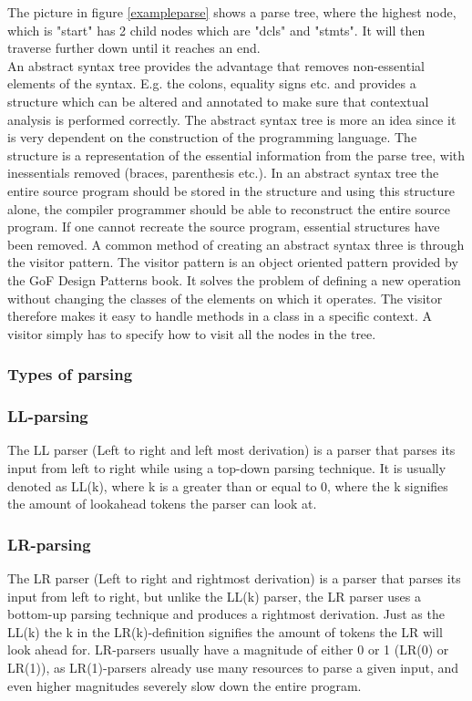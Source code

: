 The picture in figure \ref{exampleparse} shows a parse tree, where the highest node, which is "start" has 2 child nodes which are "dcls" and "stmts". It will then traverse further down until it reaches an end. \\
An abstract syntax tree provides the advantage that removes non-essential elements of the syntax. E.g. the colons, equality signs etc. and provides a structure which can be altered and annotated to make sure that contextual analysis is performed correctly.
The abstract syntax tree is more an idea since it is very dependent on the construction of the programming language. The structure is a representation of the essential information from the parse tree, with inessentials removed (braces, parenthesis etc.). In an abstract syntax tree the entire source program should be stored in the structure and using this structure alone, the compiler programmer should be able to reconstruct the entire source program. If one cannot recreate the source program, essential structures have been removed.\cite{crafting-a-compiler}
A common method of creating an abstract syntax three is through the visitor pattern. The visitor pattern is an object oriented pattern provided by the GoF Design Patterns book.
It solves the problem of defining a new operation without changing the classes of the elements on which it operates.
The visitor therefore makes it easy to handle methods in a class in a specific context. A visitor simply has to specify how to visit all the nodes in the tree.
\subsubsection{Types of parsing}
\subsubsection*{LL-parsing}
The LL parser (Left to right and left most derivation) is a parser that parses its input from left to right while using a top-down parsing technique. It is usually denoted as LL(k), where k is a greater than or equal to 0, where the k signifies the amount of lookahead tokens the parser can look at\cite{conceptsOfProgrammingLanguages}.

\subsubsection*{LR-parsing}
The LR parser (Left to right and rightmost derivation) is a parser that parses its input from left to right, but unlike the LL(k) parser, the LR parser uses a bottom-up parsing technique and produces a rightmost derivation. Just as the LL(k) the k in the LR(k)-definition signifies the amount of tokens the LR will look ahead for\cite{conceptsOfProgrammingLanguages}. LR-parsers usually have a magnitude of either 0 or 1 (LR(0) or LR(1)), as LR(1)-parsers already use many resources to parse a given input, and even higher magnitudes severely slow down the entire program.

